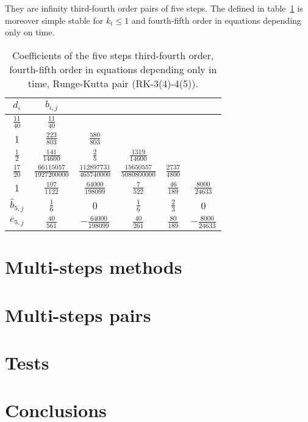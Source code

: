\documentclass[a4paper]{article}
\begin{document}
They are infinity third-fourth order pairs of five steps. The defined in
table~\ref{TableRKIIIvIV} is moreover simple stable for $k_t\leq1$ and 
fourth-fifth order in equations depending only on time.
\begin{table}[ht]
	\renewcommand*{\arraystretch}{1.3}
	\centering
	\begin{tabular}{c|ccccc}
		$d_{i}$ & $b_{i,j}$ \\ \hline
		$\frac{11}{40}$ & $\frac{11}{40}$ \\
		1 & $\frac{223}{803}$ & $\frac{580}{803}$ \\
		$\frac12$ & $\frac{141}{14600}$ & $\frac25$ & $\frac{1319}{14600}$ \\
		$\frac{17}{20}$ & $\frac{66115057}{1927200000}$ & 
			$\frac{112897731}{465740000}$ & $\frac{15650557}{5080800000}$
			& $\frac{2737}{4800}$ \\
		1 & $\frac{107}{1122}$ & $\frac{64000}{198099}$ & $\frac7{522}$ & 
			$\frac{46}{189}$ & $\frac{8000}{24633}$ \\ \hline
		$\hat{b}_{5,j}$ & $\frac16$ & 0 & $\frac16$ & $\frac23$ & 0 \\ \hline
		$e_{5,j}$ & $\frac{40}{561}$ & $-\frac{64000}{198099}$ & $\frac{40}{261}$
			& $\frac{80}{189}$ & $-\frac{8000}{24633}$
	\end{tabular}
	\caption{Coefficients of the five steps third-fourth order, fourth-fifth order
		in equations depending only in time, Runge-Kutta pair (RK-3(4)-4(5)).
		\label{TableRKIIIvIV}}
\end{table}

\section{Multi-steps methods}

\section{Multi-steps pairs}

\section{Tests}

\section{Conclusions}
\end{document}
